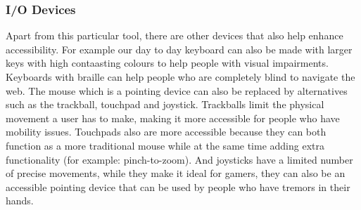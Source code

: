 \documentclass[11pt]{article}
\begin{document}
\subsubsection{I/O Devices}
\label{sec:org09b81d9}
Apart from this particular tool, there are other devices that also help enhance accessibility. For
example our day to day keyboard can also be made with larger keys with high contaasting colours to
help people with visual impairments. Keyboards with braille can help people who are completely blind
to navigate the web. The mouse which is a pointing device can also be replaced by alternatives such
as the trackball, touchpad and joystick. Trackballs limit the physical movement a user has to make,
making it more accessible for people who have mobility issues. Touchpads also are more accessible
because they can both function as a more traditional mouse while at the same time adding extra
functionality (for example: pinch-to-zoom). And joysticks have a limited number of precise
movements, while they make it ideal for gamers, they can also be an accessible pointing device that
can be used by people who have tremors in their hands.
\end{document}
